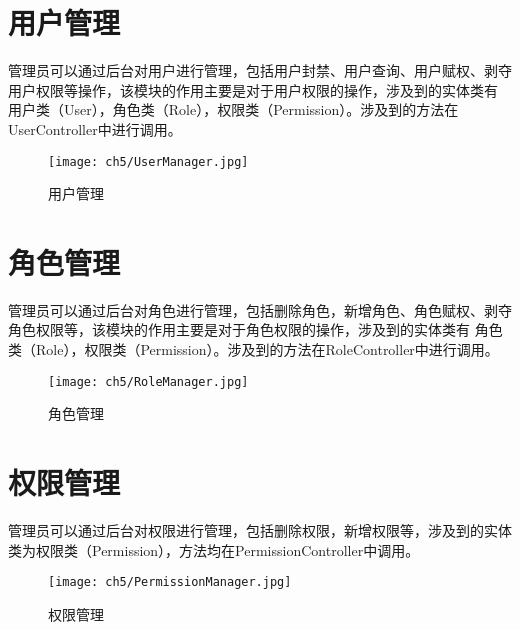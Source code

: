 \section{用户管理}
管理员可以通过后台对用户进行管理，包括用户封禁、用户查询、用户赋权、剥夺用户权限等操作，该模块的作用主要是对于用户权限的操作，涉及到的实体类有
用户类（User），角色类（Role），权限类（Permission）。涉及到的方法在UserController中进行调用。
\begin{figure}[htbp]
    \centering
    \texttt{[image: ch5/UserManager.jpg]}
    \caption{用户管理}\label{fig:UserManager}
    \vspace{\baselineskip} %
\end{figure}
\section{角色管理}
管理员可以通过后台对角色进行管理，包括删除角色，新增角色、角色赋权、剥夺角色权限等，该模块的作用主要是对于角色权限的操作，涉及到的实体类有
角色类（Role），权限类（Permission）。涉及到的方法在RoleController中进行调用。
\begin{figure}[htbp]
    \centering
    \texttt{[image: ch5/RoleManager.jpg]}
    \caption{角色管理}\label{fig:RoleManager}
    \vspace{\baselineskip} %
\end{figure}
\section{权限管理}
管理员可以通过后台对权限进行管理，包括删除权限，新增权限等，涉及到的实体类为权限类（Permission），方法均在PermissionController中调用。
\begin{figure}[htbp]
    \centering
    \texttt{[image: ch5/PermissionManager.jpg]}
    \caption{权限管理}\label{fig:PermissionManager}
    \vspace{\baselineskip} %
\end{figure}


